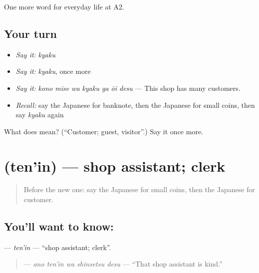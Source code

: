 \begin{grammarlens}[title={What you've built}]
One more word for everyday life at A2.
\end{grammarlens}

\subsection*{Your turn}
\begin{itemize}
\raggedright
  \item \emph{Say it:} \emph{kyaku}
  \item \emph{Say it:} \emph{kyaku}, once more
  \item \emph{Say it:} \emph{kono mise wa kyaku ga ōi desu} — This shop has many customers.
  \item \emph{Recall:} say the Japanese for banknote, then the Japanese for small coins, then say \emph{kyaku} again
\end{itemize}

\begin{tcolorbox}[breakable,colback=teal!4,colframe=teal!35!black,title={Before you move on}]
What does  mean? (\textquotedblleft{}Customer; guest, visitor\textquotedblright{}.) Say it once more.
\end{tcolorbox}
\section[\texorpdfstring{\ja{てんいん} (ten'in)}{てんいん (ten'in)}]{ (ten'in) — shop assistant; clerk}

\label{lesson:JA-C183-tenin}



\begin{quote}
Before the new one: say the Japanese for small coins, then the Japanese for customer.
\end{quote}

\subsection*{You'll want to know: }
\textbf{} — \emph{ten'in} — \textquotedblleft{}shop assistant; clerk\textquotedblright{}.

\begin{quote}
\textbf{  } — \emph{ano ten'in wa shinsetsu desu} — \textquotedblleft{}That shop assistant is kind.\textquotedblright{}
\end{quote}

